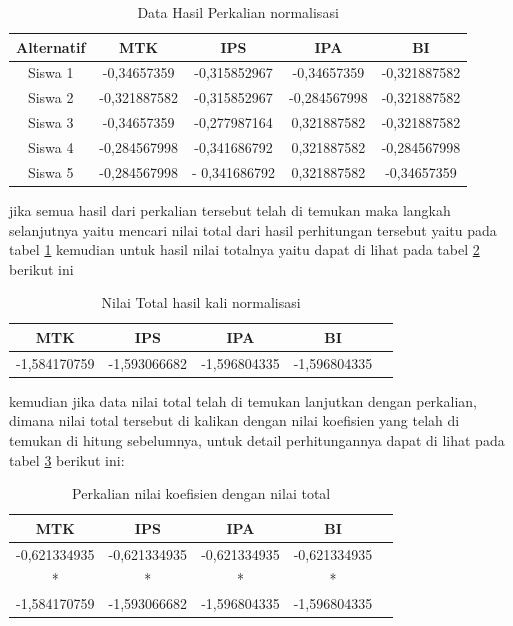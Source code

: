 \begin{table}[h]
\caption{Data Hasil Perkalian normalisasi}
\centering
\begin{tabular}{|c|c|c|c|c|}
\hline
Alternatif & MTK & IPS & IPA&BI\\
\hline
Siswa 1 &-0,34657359 & -0,315852967 & -0,34657359 &  -0,321887582\\
\hline
Siswa 2 &-0,321887582 & -0,315852967 & -0,284567998 & -0,321887582\\
\hline
Siswa 3 &-0,34657359 & -0,277987164 & 0,321887582 & -0,321887582\\
\hline
Siswa 4 &-0,284567998 &-0,341686792 & 0,321887582 & -0,284567998\\
\hline
Siswa 5 &-0,284567998 &- 0,341686792 & 0,321887582 & -0,34657359\\
\hline
\end{tabular}
\label{ts7}
\end{table}

jika semua hasil dari perkalian tersebut telah di temukan maka langkah selanjutnya yaitu mencari nilai total dari hasil perhitungan tersebut yaitu pada tabel \ref{ts7} kemudian untuk hasil nilai totalnya yaitu dapat di lihat pada tabel \ref{ts8} berikut ini
\pagebreak
\begin{table}[h]
\caption{Nilai Total hasil kali normalisasi}
\centering
\begin{tabular}{|c|c|c|c|c|}
\hline
 MTK & IPS & IPA&BI\\
\hline
-1,584170759 & -1,593066682 & -1,596804335 &  -1,596804335\\
\hline
\end{tabular}
\label{ts8}
\end{table}

kemudian jika data nilai total telah di temukan lanjutkan dengan perkalian, dimana nilai total tersebut di kalikan dengan nilai koefisien yang telah di temukan di hitung sebelumnya, untuk detail perhitungannya dapat di lihat pada tabel \ref{ts9} berikut ini:


\begin{table}[h]
\caption{Perkalian nilai koefisien dengan nilai total}
\centering
\begin{tabular}{|c|c|c|c|c|}
\hline
 MTK & IPS & IPA&BI\\
\hline
-0,621334935&-0,621334935&-0,621334935&-0,621334935\\
*&*&*&*\\
-1,584170759 & -1,593066682 & -1,596804335 &  -1,596804335\\
\hline
\end{tabular}
\label{ts9}
\end{table}

